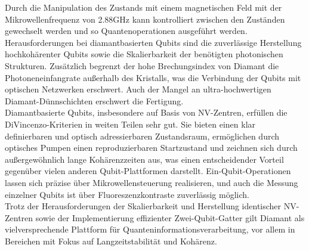 Durch die Manipulation des Zustands mit einem magnetischen Feld mit der Mikrowellenfrequenz von 2.88GHz kann kontrolliert zwischen den Zuständen gewechselt werden und so Quantenoperationen ausgeführt werden. \\

Herausforderungen  bei diamantbasierten Qubits sind die zuverlässige Herstellung hochkohärenter Qubits sowie die Skalierbarkeit der benötigten photonischen Strukturen. Zusätzlich begrenzt der hohe Brechungsindex von Diamant die Photoneneinfangrate außerhalb des Kristalls, was die Verbindung der Qubits mit optischen Netzwerken erschwert. Auch der Mangel an ultra-hochwertigen Diamant-Dünnschichten erschwert die Fertigung. \\

Diamantbasierte Qubits, insbesondere auf Basis von NV-Zentren, erfüllen die DiVincenzo-Kriterien in weiten Teilen sehr gut. Sie bieten einen klar definierbaren und optisch adressierbaren Zustandsraum, ermöglichen durch optisches Pumpen einen reproduzierbaren Startzustand und zeichnen sich durch außergewöhnlich lange Kohärenzzeiten aus, was einen entscheidender Vorteil gegenüber vielen anderen Qubit-Plattformen darstellt. Ein-Qubit-Operationen lassen sich präzise über Mikrowellensteuerung realisieren, und auch die Messung einzelner Qubits ist über Fluoreszenzkontraste zuverlässig möglich.  \\
Trotz der Herausforderungen der Skalierbarkeit und Herstellung identischer NV-Zentren sowie der Implementierung effizienter Zwei-Qubit-Gatter gilt Diamant als vielversprechende Plattform für Quanteninformationsverarbeitung, vor allem in Bereichen mit Fokus auf Langzeitstabilität und Kohärenz. 


\cite{ulanov_diamantbasierte_2025}


\printbibliography
